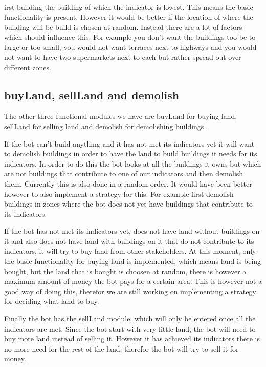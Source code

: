 \newpage

irst building the building of which the indicator is lowest. This means the basic functionality is present. However it would be better if the location of where the building will be build is chosen at random. Instead there are a lot of factors which should influence this. For example you don't want the buildings too be to large or too small, you would not want terraces next to highways and you would not want to have two supermarkets next to each but rather spread out over different zones.

\subsection{buyLand, sellLand and demolish}
The other three functional modules we have are buyLand for buying land, sellLand for selling land and demolish for demolishing buildings. 

If the bot can't build anything and it has not met its indicators yet it will want to demolish buildings in order to have the land to build buildings it needs for its indicators. In order to do this the bot looks at all the buildings it owns but which are not buildings that contribute to one of our indicators and then demolish them. Currently this is also done in a random order. It would have been better however to also implement a strategy for this. For example first demolish buildings in zones where the bot does not yet have buildings that contribute to its indicators. 

If the bot has not met its indicators yet, does not have land without buildings on it and also does not have land with buildings on it that do not contribute to its indicators, it will try to buy land from other stakeholders. At this moment, only the basic functionality for buying land is implemented, which means land is being bought, but the land that is bought is choosen at random, there is however a maximum amount of money the bot pays for a certain area. This is however not a good way of doing this, therefor we are still working on implementing a strategy for deciding what land to buy.

Finally the bot has the sellLand module, which will only be entered once all the indicators are met. Since the bot start with very little land, the bot will need to buy more land instead of selling it. However it has achieved its indicators there is no more need for the rest of the land, therefor the bot will try to sell it for money.

